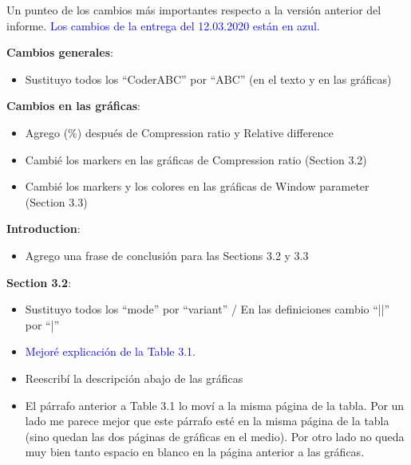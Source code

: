 \clearpage
Un punteo de los cambios más importantes respecto a la versión anterior del informe. \textcolor{blue}{Los cambios de la entrega del 12.03.2020 están en azul.}


\vspace{+5pt}
\textbf{Cambios generales}:
\vspace{-10pt}
\begin{itemize}
    \item Sustituyo todos los “CoderABC” por “ABC” (en el texto y en las gráficas)
\end{itemize}


\vspace{+5pt}
\textbf{Cambios en las gráficas}:
\vspace{-10pt}
\begin{itemize}
    \item Agrego (\%) después de Compression ratio y Relative difference
    \item Cambié los markers en las gráficas de Compression ratio (Section 3.2) 
    \item Cambié los markers y los colores en las gráficas de Window parameter (Section 3.3) 
\end{itemize}


\vspace{+5pt}
\textbf{Introduction}:
\vspace{-10pt}
\begin{itemize}
    \item Agrego una frase de conclusión para las Sections 3.2 y 3.3
\end{itemize}


\vspace{+5pt}
\textbf{Section 3.2}:
\vspace{-10pt}
\begin{itemize}
    \item Sustituyo todos los “mode” por “variant” / En las definiciones cambio “||” por “|”
    \item \textcolor{blue}{Mejoré explicación de la Table 3.1.}
    \item Reescribí la descripción abajo de las gráficas
    \item El párrafo anterior a Table 3.1 lo moví a la misma página de la tabla. Por un lado me parece mejor que este párrafo esté en la misma página de la tabla (sino quedan las dos páginas de gráficas en el medio). Por otro lado no queda muy bien tanto espacio en blanco en la página anterior a las gráficas.
\end{itemize}


